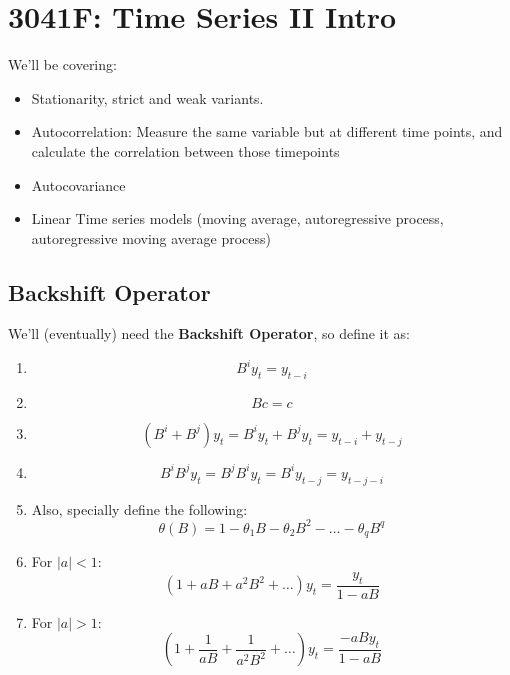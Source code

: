 \section{3041F: Time Series II Intro}
We'll be covering:
\begin{itemize}
    \item Stationarity, strict and weak variants.
    \item Autocorrelation: Measure the same variable but at different time points, and calculate the correlation between those timepoints
    \item Autocovariance
    \item Linear Time series models (moving average, autoregressive process, autoregressive moving average process)
\end{itemize}  

\subsection{Backshift Operator}
We'll (eventually) need the \textbf{Backshift Operator}, so define it as:
\begin{enumerate}
    \item \begin{equation*}
            B^iy_t = y_{t-i}
        \end{equation*}
    \item \begin{equation*}
            Bc = c
        \end{equation*}
    \item \begin{equation*}
            (B^i + B^j)y_t = B^iy_t + B^jy_t = y_{t-i} + y_{t-j}
        \end{equation*}
    \item \begin{equation*}
            B^iB^jy_t = B^jB^iy_t = B^iy_{t-j}= y_{t-j-i}   
        \end{equation*}
    \item Also, specially define the following:\begin{equation*}
            \theta(B) = 1 - \theta_1B - \theta_2B^2 - \dots - \theta_qB^q
    \end{equation*}
    \item For $|a| < 1$: \begin{equation*}
            (1 + aB + a^2B^2 + \dots )y_t = \frac{y_t}{1 - aB}
        \end{equation*}
    \item For $|a| > 1$: \begin{equation*}
            (1 + \frac{1}{aB} + \frac{1}{a^2B^2} + \dots )y_t = \frac{-aBy_t}{1
            - aB}
        \end{equation*}
    
\end{enumerate}
